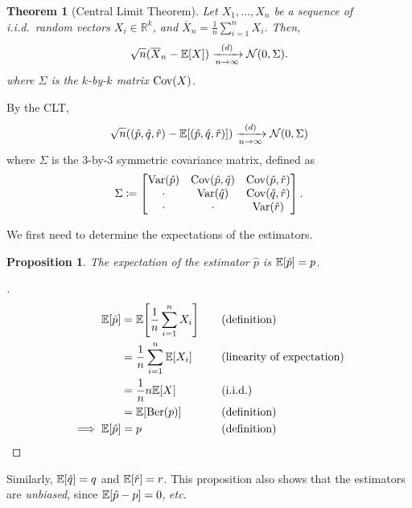 \documentclass[letterpaper, reqno]{amsart}
\newtheorem{theorem}{Theorem}[section]
\newtheorem{prop}{Proposition}[section]
\renewcommand{\qedsymbol}{\ensuremath{\blacksquare}}
\newenvironment{subproof}[1][\proofname]{%
  \renewcommand{\qedsymbol}{\ensuremath{\square}}%
  \begin{proof}[#1]%
}{%
  \end{proof}%
}
\numberwithin{equation}{section}
\newcommand{\E}[1]{\mathbb{E}\mleft[#1\mright]}
\newcommand{\Var}[1]{\operatorname{Var}\mleft(#1\mright)}
\newcommand{\Cov}[1]{\operatorname{Cov}\mleft(#1\mright)}
\newcommand{\R}{\mathbb{R}}  %
\newcommand{\N}[2]{\mathcal{N}\mleft( #1, #2 \mright)}
\newcommand{\iid}{i.i.d.}
\newcommand{\sumi}[2]{\sum_{#1=1}^{#2}}
\newcommand{\avg}[2]{\frac{1}{#2}\sumi{#1}{#2}}
\newcommand{\by}[1]{&\quad&\text{(#1)}}
\newcommand{\Dlim}{\xrightarrow[n \to \infty]{(d)}}
\newcommand{\phat}{\hat{p}}
\newcommand{\qhat}{\hat{q}}
\newcommand{\rhat}{\hat{r}}
\newcommand{\Xnbar}{\overline{X}_n}
\DeclareMathOperator{\Ber}{Ber}
\begin{document}
\begin{theorem}[Central Limit Theorem]
    Let $X_1, \dots, X_n$ be a sequence of \iid\ random vectors $X_i \in \R^k$,
    and $\Xnbar = \avg{i}{n} X_i$.
    Then,
    \[ \sqrt{n}(\Xnbar - \E{X}) \Dlim \N{0}{\Sigma}. \]
    where $\Sigma$ is the $k$-by-$k$ matrix $\Cov{X}$.
\end{theorem}

By the CLT,
\begin{equation} \label{eq:CLT}
  \sqrt{n} ((\phat, \qhat, \rhat) - \E{(\phat, \qhat, \rhat)}) \Dlim \N{0}{\Sigma}
\end{equation}
where $\Sigma$ is the 3-by-3 symmetric covariance matrix, defined as
\begin{equation}
  \Sigma \coloneqq
  \begin{bmatrix}
    \Var{\phat} & \Cov{\phat, \qhat} & \Cov{\phat, \rhat} \\
    \cdot & \Var{\qhat} & \Cov{\qhat, \rhat} \\
    \cdot & \cdot & \Var{\rhat}
  \end{bmatrix}.
\end{equation}

We first need to determine the expectations of the estimators.

\begin{prop}
  The expectation of the estimator $\phat$ is $\E{\phat} = p$.
\end{prop}
\begin{subproof}
  \begin{alignat*}{3}
    \E{\phat} &= \E{\avg{i}{n} X_i} \by{definition} \\
              &= \frac{1}{n} \sumi{i}{n} \E{X_i} \by{linearity of expectation} \\
              &= \frac{1}{n} n \E{X} \by{\iid} \\
              &= \E{\Ber(p)} \by{definition} \\
    \implies \E{\phat} &= p \by{definition} \tag*{\qedhere}
  \end{alignat*}
\end{subproof}
\noindent Similarly, $\E{\qhat} = q$ and $\E{\rhat} = r$. This proposition
also shows that the estimators are \emph{unbiased}, since $\E{\phat - p} = 0$,
\emph{etc}.
\end{document}
